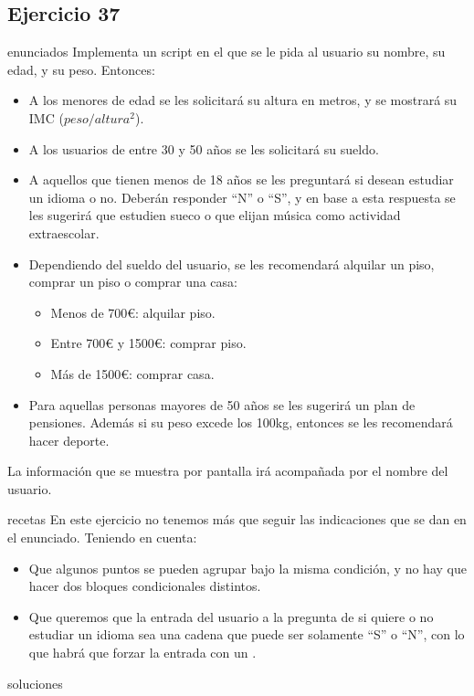 \subsection{Ejercicio 37}
\def\parte{enunciados}
\ifx\capitulo\parte
Implementa un script en el que se le pida al usuario su nombre, su edad, y su peso. Entonces:

\begin{itemize}
\item A los menores de edad se les solicitará su altura en metros, y se mostrará su IMC ($peso / altura^2$).
\item A los usuarios de entre 30 y 50 años se les solicitará su sueldo.
\item A aquellos que tienen menos de 18 años se les preguntará si desean estudiar un idioma o no. Deberán responder ``N'' o ``S'', y en base a esta respuesta se les sugerirá que estudien sueco o que elijan música como actividad extraescolar.
\item Dependiendo del sueldo del usuario, se les recomendará alquilar un piso, comprar un piso o comprar una casa:
  \begin{itemize}
  \item Menos de 700€: alquilar piso.
  \item Entre 700€ y 1500€: comprar piso.
  \item Más de 1500€: comprar casa.
  \end{itemize}
\item Para aquellas personas mayores de 50 años se les sugerirá un plan de pensiones. Además si su peso excede los 100kg, entonces se les recomendará hacer deporte.
\end{itemize} 
La información que se muestra por pantalla irá acompañada por el nombre del usuario.
\fi

\def\parte{recetas}
\ifx\capitulo\parte
En este ejercicio no tenemos más que seguir las indicaciones que se dan en el enunciado. Teniendo en cuenta:

\begin{itemize}
\item Que algunos puntos se pueden agrupar bajo la misma condición, y no hay que hacer dos bloques condicionales distintos.
\item Que queremos que la entrada del usuario a la pregunta de si quiere o no estudiar un idioma sea una cadena que puede ser solamente ``S'' o ``N'', con lo que habrá que forzar la entrada con un .
\end{itemize}
\fi

\def\parte{soluciones}
\ifx\capitulo\parte

\fi

